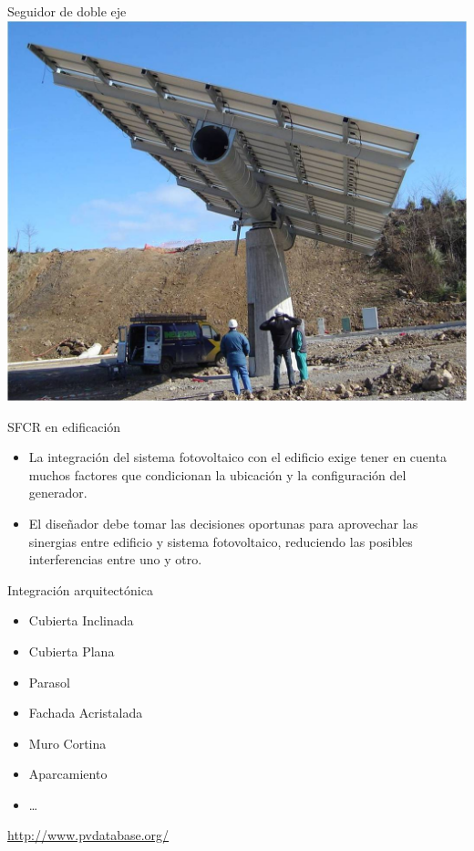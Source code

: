 \documentclass[xcolor={usenames,svgnames,dvipsnames}]{beamer}
\begin{document}
\begin{frame}[label=sec-1-3-7]{Seguidor de doble eje}
\includegraphics[width=.9\linewidth]{../figs/SeguidorReocin.jpg}
\end{frame}

\begin{frame}[label=sec-1-3-8]{SFCR en edificación}
\begin{itemize}
\item La integración del sistema fotovoltaico con el edificio exige tener en cuenta muchos factores que condicionan la ubicación y la configuración del generador.

\item El diseñador debe tomar las decisiones oportunas para \alert{aprovechar las sinergias entre edificio y sistema fotovoltaico}, reduciendo las posibles interferencias entre uno y otro.
\end{itemize}
\end{frame}

\begin{frame}[label=sec-1-3-9]{Integración arquitectónica}
\begin{itemize}
\item Cubierta Inclinada
\item Cubierta Plana
\item Parasol
\item Fachada Acristalada
\item Muro Cortina
\item Aparcamiento
\item \ldots{}
\end{itemize}

\begin{block}{}
\url{http://www.pvdatabase.org/}
\end{block}
\end{frame}
\end{document}
